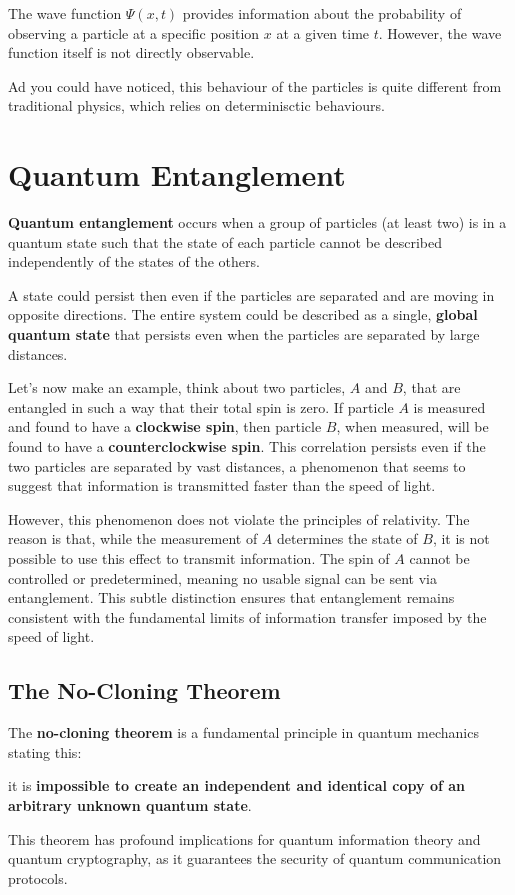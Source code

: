 The wave function \(\Psi(x,t)\) provides information about the
probability of observing a particle at a specific position \(x\) at a
given time \(t\). However, the wave function itself is not directly
observable. 

Ad you could have noticed, this behaviour of the particles is quite
different from traditional physics, which relies on determinisctic
behaviours.


\section{Quantum Entanglement}

\begin{boxH}
\textbf{Quantum entanglement} occurs when a group of particles (at
least two) is in a quantum state such that the state of each particle
cannot be described independently of the states of the others.
\end{boxH}
A state could persist then even if the particles are separated and are
moving in opposite directions. The entire system could be described as
a single, \textbf{global quantum state} that persists even when the
particles are separated by large distances.

Let's now make an example, think about two particles, \(A\) and \(B\),
that are entangled in such a way that their total spin is zero. If
particle \(A\) is measured and found to have a \textbf{clockwise
spin}, then particle \(B\), when measured, will be found to have a
\textbf{counterclockwise spin}. This correlation persists even if the
two particles are separated by vast distances, a phenomenon that seems
to suggest that information is transmitted faster than the speed of
light.

However, this phenomenon does not violate the principles of
relativity. The reason is that, while the measurement of \(A\)
determines the state of \(B\), it is not possible to use this effect
to transmit information. The spin of \(A\) cannot be controlled or
predetermined, meaning no usable signal can be sent via entanglement.
This subtle distinction ensures that entanglement remains consistent
with the fundamental limits of information transfer imposed by the
speed of light.

\subsection{The No-Cloning Theorem}

The \textbf{no-cloning theorem} is a fundamental principle in quantum
mechanics stating this: 
\begin{boxH}
  it is \textbf{impossible to create an independent and identical copy
  of an arbitrary unknown quantum state}.
\end{boxH}
This theorem has profound implications for quantum information theory
and quantum cryptography, as it guarantees the security of quantum
communication protocols.

